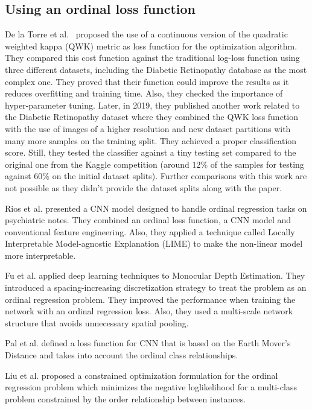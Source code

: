 \documentclass[preprint]{elsarticle}
\begin{document}
\subsection{Using an ordinal loss function}

De la Torre et al.~\cite{de2018weighted} proposed the use of a continuous version of the quadratic weighted kappa (QWK) metric as loss function for the optimization algorithm. They compared this cost function against the traditional log-loss function using three different datasets, including the Diabetic Retinopathy database as the most complex one. They proved that their function could improve the results as it reduces overfitting and training time. Also, they checked the importance of hyper-parameter tuning. Later, in 2019, they published another work \cite{de2019deep} related to the Diabetic Retinopathy dataset where they combined the QWK loss function with the use of images of a higher resolution and new dataset partitions with many more samples on the training split. They achieved a proper classification score. Still, they tested the classifier against a tiny testing set compared to the original one from the Kaggle competition (around $12\%$ of the samples for testing against $60\%$ on the initial dataset splits). Further comparisons with this work are not possible as they didn't provide the dataset splits along with the paper.

Rios et al. \cite{rios2017ordinal} presented a CNN model designed to handle ordinal regression tasks on psychiatric notes. They combined an ordinal loss function, a CNN model and conventional feature engineering. Also, they applied a technique called Locally Interpretable Model-agnostic Explanation (LIME) to make the non-linear model more interpretable.

Fu et al. \cite{fu2018deep} applied deep learning techniques to Monocular Depth Estimation. They introduced a spacing-increasing discretization strategy to treat the problem as an ordinal regression problem. They improved the performance when training the network with an ordinal regression loss. Also, they used a multi-scale network structure that avoids unnecessary spatial pooling.

Pal et al. \cite{pal2018severity} defined a loss function for CNN that is based on the Earth Mover's Distance and takes into account the ordinal class relationships.

Liu et al. \cite{liu2018constrained} proposed a constrained optimization formulation for the ordinal regression problem which minimizes the negative loglikelihood for a multi-class problem constrained by the order relationship between instances.	
\end{document}
